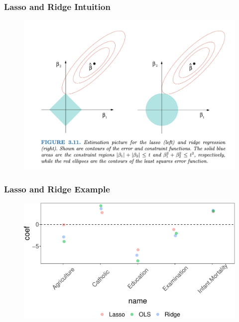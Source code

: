 \documentclass[
  shownotes,
  xcolor={svgnames},
  hyperref={colorlinks,citecolor=DarkBlue,linkcolor=DarkRed,urlcolor=DarkBlue}
  , aspectratio=169]{beamer}
\begin{document}
\begin{frame}[fragile]
\frametitle{Lasso and Ridge Intuition}

   \begin{figure}[H] \centering
            \captionsetup{justification=centering}
              \includegraphics[scale=0.4]{figures/lasso_ridge}
 \end{figure}



\end{frame}
\begin{frame}[fragile]
\frametitle{Lasso and Ridge Example}

   \begin{figure}[H] \centering
            \captionsetup{justification=centering}
              \includegraphics[scale=0.6]{figures/comp}
 \end{figure}

 \end{frame}
\end{document}
